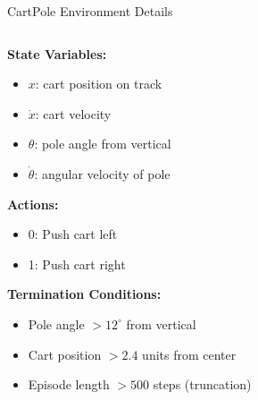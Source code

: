 \documentclass[aspectratio=169,10pt]{beamer}
\begin{document}
\begin{frame}{CartPole Environment Details}

\begin{columns}[T]  %
  \begin{column}{0.4\textwidth}

  \textbf{State Variables:}
  \begin{itemize}
      \item $x$: cart position on track
      \item $\dot{x}$: cart velocity
      \item $\theta$: pole angle from vertical
      \item $\dot{\theta}$: angular velocity of pole
  \end{itemize}

  \vfill

  \textbf{Actions:}
  \begin{itemize}
      \item 0: Push cart left
      \item 1: Push cart right
  \end{itemize}

  \vfill

  \textbf{Termination Conditions:}
  \begin{itemize}
      \item Pole angle $> 12^\circ$ from vertical
      \item Cart position $> 2.4$ units from center
      \item Episode length $> 500$ steps (truncation)
  \end{itemize}

  \end{column}

\begin{column}{0.6\textwidth}
\end{column}
\end{columns}
\end{frame}
\end{document}
